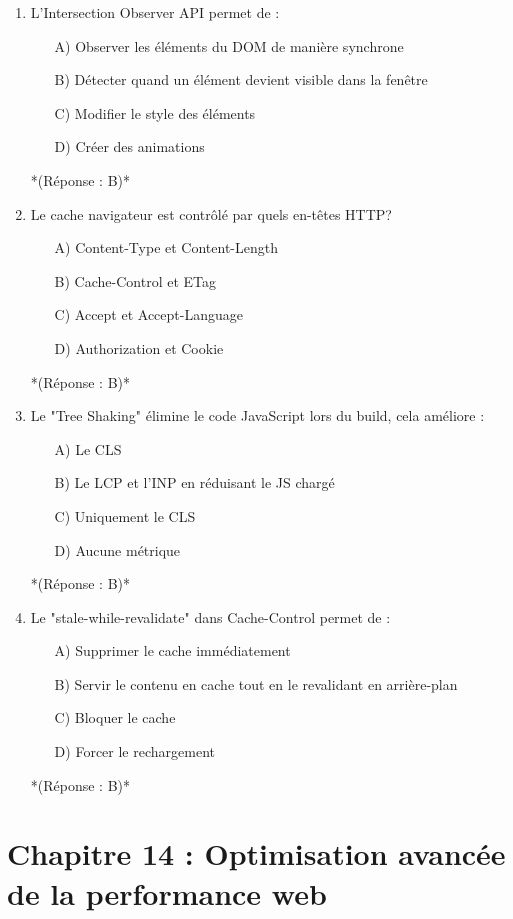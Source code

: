 \documentclass[12pt,a4paper,twoside]{report}
\begin{document}
\begin{enumerate}
\item L'Intersection Observer API permet de :
\begin{itemize}
\item[A)] Observer les éléments du DOM de manière synchrone
\item[B)] Détecter quand un élément devient visible dans la fenêtre
\item[C)] Modifier le style des éléments
\item[D)] Créer des animations
\end{itemize}
*(Réponse : B)*

\item Le cache navigateur est contrôlé par quels en-têtes HTTP?
\begin{itemize}
\item[A)] Content-Type et Content-Length
\item[B)] Cache-Control et ETag
\item[C)] Accept et Accept-Language
\item[D)] Authorization et Cookie
\end{itemize}
*(Réponse : B)*

\item Le "Tree Shaking" élimine le code JavaScript lors du build, cela améliore :
\begin{itemize}
\item[A)] Le CLS
\item[B)] Le LCP et l'INP en réduisant le JS chargé
\item[C)] Uniquement le CLS
\item[D)] Aucune métrique
\end{itemize}
*(Réponse : B)*

\item Le "stale-while-revalidate" dans Cache-Control permet de :
\begin{itemize}
\item[A)] Supprimer le cache immédiatement
\item[B)] Servir le contenu en cache tout en le revalidant en arrière-plan
\item[C)] Bloquer le cache
\item[D)] Forcer le rechargement
\end{itemize}
*(Réponse : B)*

\end{enumerate}
\section*{Chapitre 14 : Optimisation avancée de la performance web}
\end{document}
